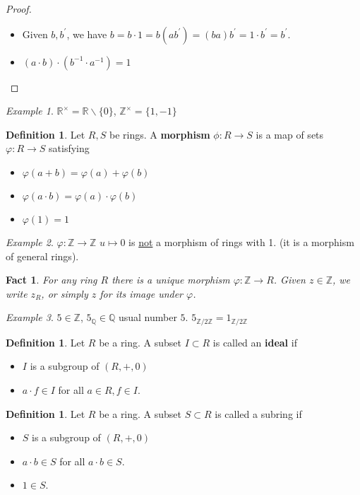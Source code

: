\documentclass{amsart}
\newcommand{\RR}{\mathbb{R}}
\newcommand{\QQ}{\mathbb{Q}}
\newcommand{\ZZ}{\mathbb{Z}}
\newcommand{\Zn}[1]{\mathbb{Z} / #1 \mathbb{Z}}
\newtheorem{fact}[thm]{Fact}
\theoremstyle{definition}
\newtheorem{defn}[thm]{Definition}
\theoremstyle{remark}
\newtheorem*{ex}{Example}
\begin{document}
\begin{proof} \hspace{0.5cm}
    \begin{itemize}
        \item Given $b, b^\prime$, we have $b = b \cdot 1 = b(ab^\prime) = (ba)b^\prime = 1 \cdot b^\prime
         = b^\prime$.
         \item $(a \cdot b) \cdot (b^{-1} \cdot a^{-1}) = 1$
    \end{itemize}
\end{proof}
\begin{ex}
    $\RR^\times = \RR \backslash \{0\}$, $\ZZ^\times = \{1, -1\}$
\end{ex}
\begin{defn}
    Let $R, S$ be rings. A \textbf{morphism} $\phi:R \rightarrow S$ is a map of
    sets $\varphi:R \rightarrow S$ satisfying
    \begin{itemize}
        \item $\varphi(a + b) = \varphi(a) + \varphi(b)$
        \item $\varphi(a \cdot b) = \varphi(a) \cdot \varphi(b)$
        \item $\varphi(1) = 1$
    \end{itemize}
\end{defn}
\begin{ex}
    $\varphi:\ZZ \rightarrow \ZZ$ $u \mapsto 0$ is \underline{not} a morphism of
    rings with 1. (it is a morphism of general rings).
\end{ex}
\begin{fact}
    For any ring $R$ there is a unique morphism $\varphi:\ZZ \rightarrow R$. Given
    $z \in \ZZ$, we write $z_{R}$, or simply $z$ for its image under $\varphi$.
\end{fact}
\begin{ex}
    $5 \in \ZZ$, $5_{\QQ} \in \QQ$ usual number $5$. $5_{\Zn 2} = 1_{\Zn 2}$
\end{ex}
\begin{defn}
    Let $R$ be a ring. A subset $I \subset R$ is called an \textbf{ideal} if
    \begin{itemize}
        \item $I$ is a subgroup of $(R, +, 0)$
        \item $a \cdot f \in I$ for all $a \in R, f \in I$.
    \end{itemize}
\end{defn}
\begin{defn}
    Let $R$ be a ring. A subset $S \subset R$ is called a subring if
    \begin{itemize}
        \item $S$ is a subgroup of $(R, +, 0)$
        \item $a \cdot b \in S$ for all $a \cdot b \in S$.
        \item $1 \in S$.
    \end{itemize}
\end{defn}
\end{document}
